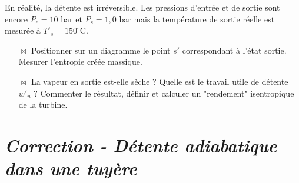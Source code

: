 \documentclass{report}
\begin{document}
En réalité, la détente est irréversible. Les pressions d'entrée et de sortie sont encore $P_e=10$ bar et $P_s=1,0$ bar mais la température de sortie réelle est mesurée à $T'_s=150^\circ$C. 

\begin{itemize}

	\item[$\bowtie$] Positionner sur un diagramme le point $s'$ correspondant à l'état sortie. Mesurer l'entropie créée massique.
	
	\item[$\bowtie$] La vapeur en sortie est-elle sèche ? Quelle est le travail utile de détente $w'_u$ ? Commenter le résultat, définir et calculer un "rendement" isentropique de la turbine. 

\end{itemize}

\newpage

\section*{\textit{Correction - Détente adiabatique dans une tuyère}}
\end{document}

